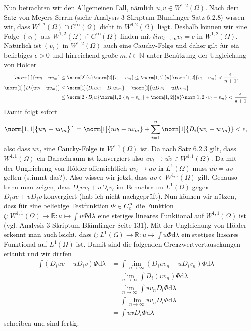 \begin{solution}
Nun betrachten wir den Allgemeinen Fall, nämlich $u,v\in W^{1,2}(\Omega)$. Nach dem Satz von Meyers-Serrin (siehe Analysis 3 Skriptum Blümlinger Satz 6.2.8) wissen wir, dass $W^{1,2}(\Omega)\cap C^\infty(\Omega)$ dicht in $W^{1,2}(\Omega)$ liegt. Deshalb können wir eine Folge $(v_l)$ aus $W^{1,2}(\Omega)\cap C^\infty(\Omega)$ finden mit $lim_{l\to\infty}v_l=v$ in $W^{1,2}(\Omega)$. Natürlich ist $(v_l)$ in $W^{1,2}(\Omega)$ auch eine Cauchy-Folge und daher gilt für ein beliebiges $\epsilon>0$ und hinreichend große $m,l\in\mathbb{N}$ unter Benützung der Ungleichung von Hölder
\begin{align*}
    \norm[1]{uv_l-uv_m}&\leq\norm[2]{u}\norm[2]{v_l-v_m}\leq\norm[1,2]{u}\norm[1,2]{v_l-v_m}<\frac{\epsilon}{n+1},\\
    \norm[1]{D_i(uv_l-uv_m)}&\leq\norm[1]{D_iuv_l-D_iuv_m}+\norm[1]{uD_iv_l-uD_iv_m}\\
    &\leq\norm[2]{D_iu}\norm[1,2]{v_l-v_m}+\norm[1,2]{u}\norm[1,2]{v_l-v_m}<\frac{\epsilon}{n+1}
\end{align*}
Damit folgt sofort
\begin{align*}
    \norm[1,1]{uv_l-uv_m}^\sim=\norm[1]{uv_l-uv_m}+\sum_{i=1}^n\norm[1]{D_i(uv_l-uv_m)}<\epsilon,
\end{align*}
also dass $uv_l$ eine Cauchy-Folge in $W^{1,1}(\Omega)$ ist. Da nach Satz 6.2.3 gilt, dass $W^{1,1}(\Omega)$ ein Banachraum ist konvergiert also $uv_l\to u\tilde{v}\in W^{1,1}(\Omega)$. Da mit der Ungleichung von Hölder offensichtlich $uv_l\to uv$ in $L^1(\Omega)$ muss $u\tilde{v}=uv$ gelten (stimmt das?). Also wissen wir jetzt, dass $uv\in W^{1,1}(\Omega)$ gilt. Genauso kann man zeigen, dass $D_iuv_l+uD_iv_l$ im Banachraum $L^1(\Omega)$ gegen $D_iuv+uD_iv$ konvergiert (hab ich nicht nachgeprüft). Nun können wir nützen, dass für eine beliebige Testfunktion $\Phi \in C_c^\infty$ die Funktion $\zeta:W^{1,1}(\Omega)\to\mathbb{R}:u\mapsto\int u\Phi\mathrm{d}\lambda$ eine stetiges lineares Funktional auf $W^{1,1}(\Omega)$ ist (vgl. Analysis 3 Skriptum Blümlinger Seite 131). Mit der Ungleichung von Hölder erkennt man auch leicht, dass $\xi:L^1(\Omega)\to\mathbb{R}:u\mapsto\int u\Phi\mathrm{d}\lambda$ ein stetiges lineares Funktional auf $L^1(\Omega)$ ist. Damit sind die folgenden Grenzwertvertauschungen erlaubt und wir dürfen
\begin{align*}
    \int (D_iuv+uD_iv)\Phi\mathrm{d}\lambda&=\int \lim_{n\to\infty}(D_iuv_n+uD_iv_n)\Phi\mathrm{d}\lambda\\
    &=\lim_{n\to\infty}\int D_i(uv_n)\Phi\mathrm{d}\lambda\\
    &=\lim_{n\to\infty}\int uv_nD_i\Phi\mathrm{d}\lambda\\
    &=\int\lim_{n\to\infty}uv_nD_i\Phi\mathrm{d}\lambda\\
    &=\int uvD_i\Phi\mathrm{d}\lambda
\end{align*} 
schreiben und sind fertig.
\end{solution}
